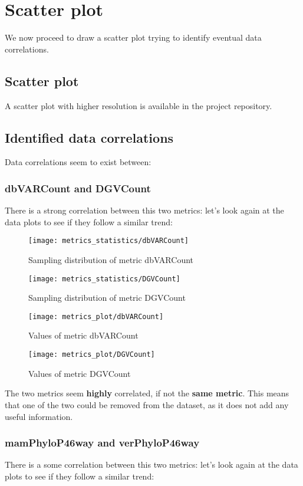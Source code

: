 \chapter{Scatter plot}
We now proceed to draw a scatter plot trying to identify eventual data correlations.

\section{Scatter plot}
A scatter plot with higher resolution is available in the project repository.
\begin{center}
\end{center}

\section{Identified data correlations}
Data correlations seem to exist between:

\subsection{dbVARCount and DGVCount}
There is a strong correlation between this two metrics: let's look again at the data plots to see if they follow a similar trend:

\begin{figure}
	\texttt{[image: metrics\_statistics/dbVARCount]}
	\caption{Sampling distribution of metric dbVARCount}
\end{figure}
\begin{figure}
	\texttt{[image: metrics\_statistics/DGVCount]}
	\caption{Sampling distribution of metric DGVCount}
\end{figure}
\begin{figure}
	\texttt{[image: metrics\_plot/dbVARCount]}
	\caption{Values of metric dbVARCount}
\end{figure}
\begin{figure}
	\texttt{[image: metrics\_plot/DGVCount]}
	\caption{Values of metric DGVCount}
\end{figure}

The two metrics seem \textbf{highly} correlated, if not the \textbf{same metric}. This means that one of the two could be removed from the dataset, as it does not add any useful information.

\subsection{mamPhyloP46way and verPhyloP46way}
There is a some correlation between this two metrics: let's look again at the data plots to see if they follow a similar trend:

